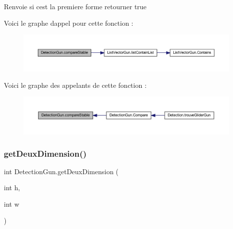 \begin{DoxyReturn}{Renvoie}
si c\textquotesingle{}est la premiere forme retourner true 
\end{DoxyReturn}


Voici le graphe d\textquotesingle{}appel pour cette fonction \+:\nopagebreak
\begin{figure}[H]
\begin{center}
\leavevmode
\includegraphics[width=350pt]{class_detection_gun_af0283c67f8fe041c2ff8ded541054d56_cgraph}
\end{center}
\end{figure}
Voici le graphe des appelants de cette fonction \+:\nopagebreak
\begin{figure}[H]
\begin{center}
\leavevmode
\includegraphics[width=350pt]{class_detection_gun_af0283c67f8fe041c2ff8ded541054d56_icgraph}
\end{center}
\end{figure}
\mbox{\label{class_detection_gun_a2bd76f00286c4916cc9e525e9e4403bb}} 
\subsubsection{\texorpdfstring{get\+Deux\+Dimension()}{getDeuxDimension()}}
{\footnotesize\ttfamily int Detection\+Gun.\+get\+Deux\+Dimension (\begin{DoxyParamCaption}\item[{int}]{h,  }\item[{int}]{w }\end{DoxyParamCaption})\hspace{0.3cm}{\ttfamily [inline]}}

\mbox{\label{class_detection_gun_a0a14866d2727aea5d457121bd646f3bb}} 
